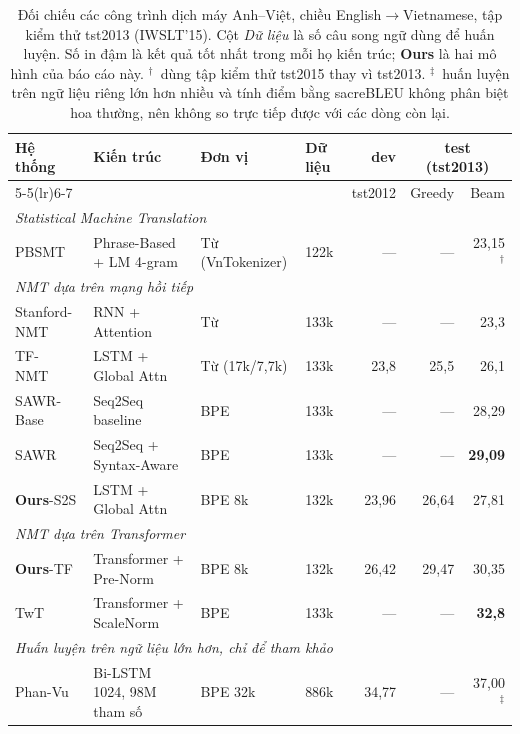 \documentclass[11pt,a4paper]{article}
\newcommand{\ours}{\textbf{Ours}}
\newcommand{\best}[1]{\textbf{#1}}
\begin{document}
\begin{table}[H]
\centering
\footnotesize
\setlength{\tabcolsep}{4.5pt}
\caption{Đối chiếu các công trình dịch máy Anh--Việt, chiều
English$\rightarrow$Vietnamese, tập kiểm thử tst2013 (IWSLT'15). Cột \emph{Dữ
liệu} là số câu song ngữ dùng để huấn luyện. Số in đậm là kết quả tốt nhất trong
mỗi họ kiến trúc; \ours{} là hai mô hình của báo cáo này. $^\dagger$~dùng tập
kiểm thử tst2015 thay vì tst2013. $^\ddagger$~huấn luyện trên ngữ liệu riêng lớn
hơn nhiều và tính điểm bằng sacreBLEU không phân biệt hoa thường, nên không so
trực tiếp được với các dòng còn lại.}
\label{tab:sota}
\begin{tabular}{llllrrr}
\toprule
\multirow{2}{*}{\textbf{Hệ thống}} & \multirow{2}{*}{\textbf{Kiến trúc}}
& \multirow{2}{*}{\textbf{Đơn vị}} & \multirow{2}{*}{\textbf{Dữ liệu}}
& \textbf{dev} & \multicolumn{2}{c}{\textbf{test (tst2013)}} \\
\cmidrule(lr){5-5}\cmidrule(lr){6-7}
 & & & & tst2012 & Greedy & Beam \\
\midrule
\multicolumn{7}{l}{\textit{Statistical Machine Translation}} \\
PBSMT~\cite{tran2015}
  & Phrase-Based + LM 4-gram & Từ (VnTokenizer) & 122k & --- & --- & 23,15$^\dagger$ \\
\midrule
\multicolumn{7}{l}{\textit{NMT dựa trên mạng hồi tiếp}} \\
Stanford-NMT~\cite{luong2015iwslt}
  & RNN + Attention & Từ & 133k & --- & --- & 23,3 \\
TF-NMT~\cite{tfnmt}
  & LSTM + Global Attn & Từ (17k/7,7k) & 133k & 23,8 & 25,5 & 26,1 \\
SAWR-Base~\cite{zhang2019}
  & Seq2Seq baseline & BPE & 133k & --- & --- & 28,29 \\
SAWR~\cite{zhang2019}
  & Seq2Seq + Syntax-Aware & BPE & 133k & --- & --- & \best{29,09} \\
\ours{}-S2S
  & LSTM + Global Attn & BPE 8k & 132k & 23,96 & 26,64 & 27,81 \\
\midrule
\multicolumn{7}{l}{\textit{NMT dựa trên Transformer}} \\
\ours{}-TF
  & Transformer + Pre-Norm & BPE 8k & 132k & 26,42 & 29,47 & 30,35 \\
TwT~\cite{nguyen2019}
  & Transformer + ScaleNorm & BPE & 133k & --- & --- & \best{32,8} \\
\midrule
\multicolumn{7}{l}{\textit{Huấn luyện trên ngữ liệu lớn hơn, chỉ để tham khảo}} \\
Phan-Vu~\cite{phanvu2019}
  & Bi-LSTM 1024, 98M tham số & BPE 32k & 886k & 34,77 & --- & 37,00$^\ddagger$ \\
\bottomrule
\end{tabular}
\end{table}
\end{document}
